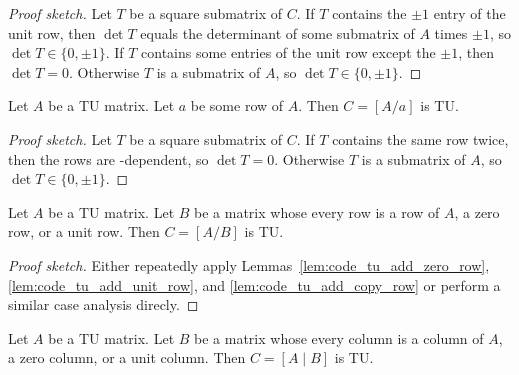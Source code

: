 \begin{proof}[Proof sketch]
  Let $T$ be a square submatrix of $C$. If $T$ contains the $\pm 1$ entry of the unit row, then $\det T$ equals the determinant of some submatrix of $A$ times $\pm 1$, so $\det T \in \{0, \pm 1\}$. If $T$ contains some entries of the unit row except the $\pm 1$, then $\det T = 0$. Otherwise $T$ is a submatrix of $A$, so $\det T \in \{0, \pm 1\}$.
\end{proof}

\begin{lemma}
  \label{lem:code_tu_add_copy_row}
  Let $A$ be a TU matrix. Let $a$ be some row of $A$. Then $C = \left[ A / a \right]$ is TU.
\end{lemma}

\begin{proof}[Proof sketch]
  Let $T$ be a square submatrix of $C$. If $T$ contains the same row twice, then the rows are \GFtwo-dependent, so $\det T = 0$. Otherwise $T$ is a submatrix of $A$, so $\det T \in \{0, \pm 1\}$.
\end{proof}

\begin{lemma}
  \label{lem:code_tu_add_ok_rows}
  Let $A$ be a TU matrix. Let $B$ be a matrix whose every row is a row of $A$, a zero row, or a unit row. Then $C = \left[ A / B \right]$ is TU.
\end{lemma}

\begin{proof}[Proof sketch]
  Either repeatedly apply Lemmas~\ref{lem:code_tu_add_zero_row}, \ref{lem:code_tu_add_unit_row}, and \ref{lem:code_tu_add_copy_row}
  or perform a similar case analysis direcly.
\end{proof}

\begin{corollary}
  \label{cor:code_tu_add_ok_cols}
  Let $A$ be a TU matrix. Let $B$ be a matrix whose every column is a column of $A$, a zero column, or a unit column. Then $C = \left[ A \mid B \right]$ is TU.
\end{corollary}

